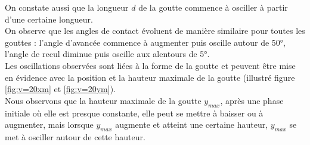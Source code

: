 On constate aussi que la longueur $d$ de la goutte commence à osciller à partir d'une certaine longueur.\\

On observe que les angles de contact évoluent de manière similaire pour toutes les gouttes : l'angle d'avancée commence à augmenter puis oscille autour de \ang{50}, l'angle de recul diminue puis oscille aux alentours de \ang{5}.\\

Les oscillations observées sont liées à la forme de la goutte et peuvent être mise en évidence avec la position et la hauteur maximale de la goutte (illustré figure \ref{fig:v=20xm} et \ref{fig:v=20ym}).\\

Nous observons que la hauteur maximale de la goutte $y_{max}$, après une phase initiale où elle est presque constante, elle peut se mettre à baisser ou à augmenter, mais lorsque $y_{max}$ augmente et atteint une certaine hauteur, $y_{max}$ se met à osciller autour de cette hauteur.
\newpage
